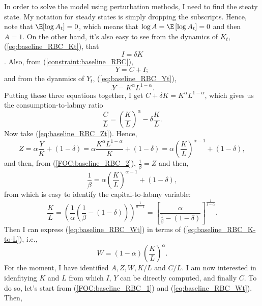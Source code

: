\documentclass{article}
\begin{document}
In order to solve the model using perturbation methods, I need to find the steaty state. My notation for steady states is simply dropping the subscripts. Hence, note that $\E[\log A_t] = 0$, which means that $\log A = \E\left[\log A_t\right] = 0$ and then $A=1$. On the other hand, it's also easy to see from the dynamics of $K_t$, (\ref{eq:baseline_RBC_Kt}), that
\begin{equation}\label{eq:baseline_RBC_ss_I_to_K}
	I = \delta K
\end{equation}.
Also, from (\ref{constraint:baseline_RBC}),
\begin{equation}\label{eq:baseline_RBC_ss_C_Y_I}
	Y = C + I;
\end{equation}
and from the dyanmics of $Y_t$, (\ref{eq:baseline_RBC_Yt}),
\begin{equation}\label{eq:baseline_RBC_ss_Y_K_L}.
	Y = K^\alpha L^{1-\alpha}.
\end{equation}
Putting these three equations together, I get $C + \delta K= K^\alpha L^{1-\alpha}$, which gives us the consumption-to-labmy ratio
\begin{equation}
	\frac{C}{L} = \left(\frac{K}{L}\right)^\alpha - \delta \frac{K}{L}.
\end{equation}
Now take (\ref{eq:baseline_RBC_Zt}). Hence,
\begin{equation}
	Z = \alpha \frac{Y}{K} + (1-\delta)= \alpha\frac{K^\alpha L^{1-\alpha}}{K} + (1-\delta) = \alpha \left(\frac{K}{L}\right)^{\alpha-1} + (1-\delta),
\end{equation}
and then, from (\ref{FOC:baseline_RBC_2}), $\frac{1}{\beta} = Z$ and then,
\begin{equation}
	\frac{1}{\beta} = \alpha \left(\frac{K}{L}\right)^{\alpha-1} + (1-\delta),
\end{equation}
from which is easy to identify the capital-to-labmy variable:
\begin{equation}\label{eq:baseline_RBC_K-to-L}
	\frac{K}{L} = \left(\frac{1}{\alpha} \left(\frac{1}{\beta}-(1-\delta)\right)\right)^{\frac{1}{\alpha-1}} = \left[\frac{\alpha}{\frac{1}{\beta}-(1-\delta)}\right]^{\frac{1}{1-\alpha}}.
\end{equation}
Then I can express (\ref{eq:baseline_RBC_Wt}) in terms of (\ref{eq:baseline_RBC_K-to-L}), i.e.,
\begin{equation}
	W = (1-\alpha)\left(\frac{K}{L}\right)^\alpha.
\end{equation}
For the moment, I have identified $A, Z, W, K/L$ and $C/L$. I am now interested in idenfitying $K$ and $L$ from which $I$, $Y$ can be directly computed, and finally $C$. To do so, let's start from (\ref{FOC:baseline_RBC_1}) and (\ref{eq:baseline_RBC_Wt}). Then,
\end{document}
